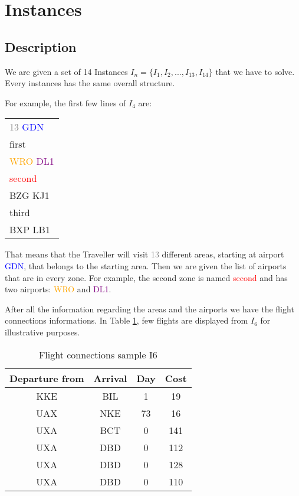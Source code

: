 \section{Instances}
\subsection{Description}

We are given a set of 14 Instances $I_{n}=\{I_1,I_2,...,I_{13},I_{14}\}$ that we have to solve.
Every instances has the same overall structure.

For example, the first few lines of $I_4$ are:

\begin{center}
    \begin{tabular}{l}
        \textcolor{gray}{13} \textcolor{blue}{GDN}      \\
        first                                           \\
        \textcolor{orange}{WRO} \textcolor{purple}{DL1} \\
        \textcolor{red}{second}                         \\
        BZG KJ1                                         \\
        third                                           \\
        BXP LB1                                         \\
    \end{tabular}
\end{center}

That means that the Traveller will visit \textcolor{gray}{13} different areas, starting at airport \textcolor{blue}{GDN}, that belongs to the starting area.
Then we are given the list of airports that are in every zone.
For example, the second zone is named \textcolor{red}{second} and has two airports: \textcolor{orange}{WRO} and \textcolor{purple}{DL1}.

After all the information regarding the areas and the airports we have the flight connections informations. In Table \ref{table:Flight connections sample I6}, few flights are displayed from $I_6$ for illustrative purposes.
\begin{table}[!ht]
    \centering
    \caption{Flight connections sample I6}
    \begin{tabular}{||cccc||}
        \toprule
        Departure from & Arrival & Day & Cost \\ [1ex]
        \midrule
        KKE            & BIL     & 1   & 19   \\
        UAX            & NKE     & 73  & 16   \\
        UXA            & BCT     & 0   & 141  \\
        UXA            & DBD     & 0   & 112  \\
        UXA            & DBD     & 0   & 128  \\
        UXA            & DBD     & 0   & 110  \\
        [1ex]
        \bottomrule
    \end{tabular}

    \label{table:Flight connections sample I6}
\end{table}


